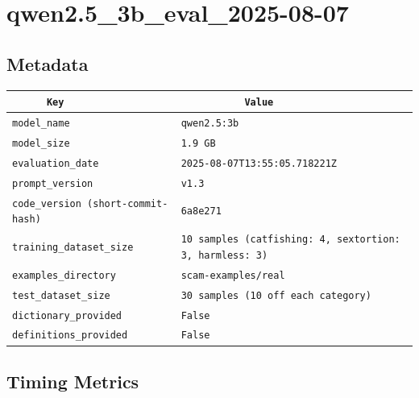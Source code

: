 \documentclass{article}
\begin{document}
\section{qwen2.5\_3b\_eval\_2025-08-07}
\subsection{Metadata}

\begin{center}
\begin{tabular}{l | l} \hline
    \verb|      Key      | & \verb|           Value           | \\ \hline
    \hline
    \verb|model_name    | & \verb|qwen2.5:3b                   | \\ \hline
    \verb|model_size    | & \verb|1.9 GB                       | \\ \hline
    \verb|evaluation_date| & \verb|2025-08-07T13:55:05.718221Z  | \\ \hline
    \verb|prompt_version| & \verb|v1.3                         | \\ \hline
    \verb|code_version (short-commit-hash)| & \verb|6a8e271                      | \\ \hline
    \verb|training_dataset_size| & \verb|10 samples (catfishing: 4, sextortion: 3, harmless: 3)| \\ \hline
    \verb|examples_directory| & \verb|scam-examples/real           | \\ \hline
    \verb|test_dataset_size| & \verb|30 samples (10 off each category)| \\ \hline
    \verb|dictionary_provided| & \verb|False                        | \\ \hline
    \verb|definitions_provided| & \verb|False                        | \\ \hline
\end{tabular}
\end{center}

\subsection{Timing Metrics}
\end{document}
